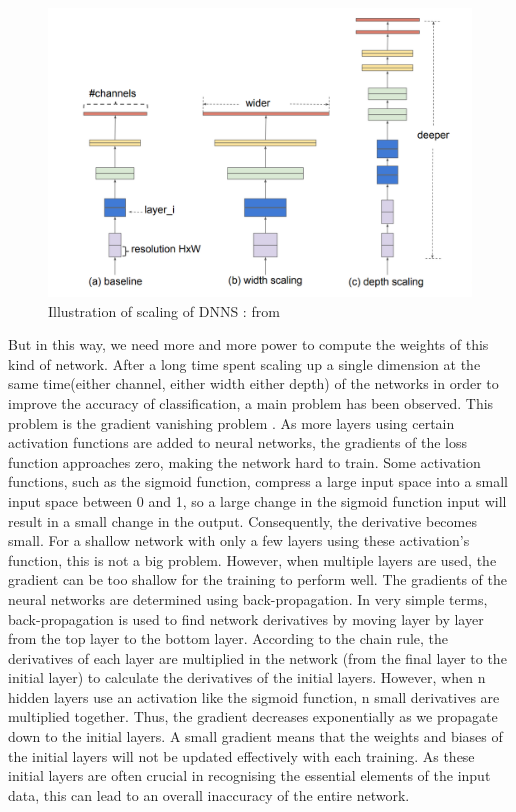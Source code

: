 \documentclass[a4paper]{article}
\begin{document}
    \begin{figure}[H]
      \includegraphics[width=\linewidth]{images/scaling.png}
      \caption{Illustration of scaling of DNNS : from \cite{DBLP:journals/corr/abs-1905-11946}}
      \label{fig:scaling}
    \end{figure}


But in this way, we need more and more power to compute the weights of this kind of network.
After a long time spent scaling up a single dimension at the same time(either channel, either width either depth) of the networks in order to improve the accuracy of classification, a main problem has been observed. 
This problem is the gradient vanishing problem \cite{vanishing}. As more layers using certain activation functions are added to neural networks, the gradients of the loss function approaches zero, making the network hard to train. Some activation functions, such as the sigmoid function, compress a large input space into a small input space between 0 and 1, so a large change in the sigmoid function input will result in a small change in the output. Consequently, the derivative becomes small.
For a shallow network with only a few layers using these activation's function, this is not a big problem. However, when multiple layers are used, the gradient can be too shallow for the training to perform well.
The gradients of the neural networks are determined using back-propagation. In very simple terms, back-propagation is used to find network derivatives by moving layer by layer from the top layer to the bottom layer. According to the chain rule, the derivatives of each layer are multiplied in the network (from the final layer to the initial layer) to calculate the derivatives of the initial layers.
However, when n hidden layers use an activation like the sigmoid function, n small derivatives are multiplied together. Thus, the gradient decreases exponentially as we propagate down to the initial layers.
A small gradient means that the weights and biases of the initial layers will not be updated effectively with each training. As these initial layers are often crucial in recognising the essential elements of the input data, this can lead to an overall inaccuracy of the entire network.
\end{document}
